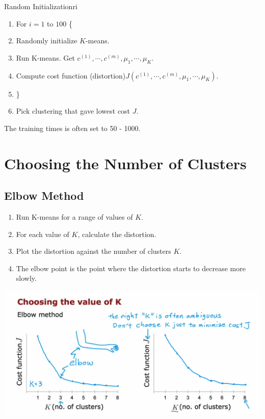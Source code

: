 \begin{thmbox}{Random Initialization}{ri}
    \begin{enumerate}
        \item[] For $i = 1$ to $100$ \{
        \item[] \hspace*{1em} Randomly initialize $K$-means.
        \item[] \hspace*{1em} Run K-means. Get $c^{(1)}, \cdots, c^{(m)}, \mu_1, \cdots, \mu_K$.
        \item[] \hspace*{1em} Compute cost function (distortion)$J(c^{(1)}, \cdots, c^{(m)}, \mu_1, \cdots, \mu_K)$. 
        \item[] \}
        \item[] Pick clustering that gave lowest cost $J$.
    \end{enumerate}
    \tcblower
    \hspace*{1em}The training times is often set to 50 - 1000.
\end{thmbox}

\section{Choosing the Number of Clusters}
\subsection*{Elbow Method}

\begin{enumerate}
    \item Run K-means for a range of values of $K$.
    \item For each value of $K$, calculate the distortion.
    \item Plot the distortion against the number of clusters $K$.
    \item The elbow point is the point where the distortion starts to decrease more slowly.
\end{enumerate}

\begin{center}
    \includegraphics*[width=\textwidth]{images/km4}
\end{center}

